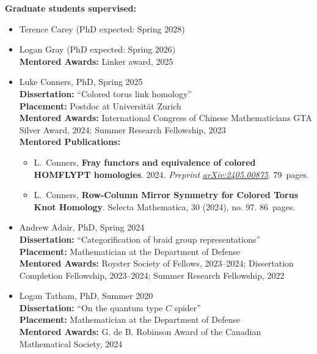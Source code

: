 \documentclass[10pt]{article}
\begin{document}
\smallskip
\noindent\textbf{Graduate students supervised:}
\begin{itemize}

\item Terence Carey (PhD expected: Spring 2028)

\item Logan Gray (PhD expected: Spring 2026) \\
\textbf{Mentored Awards:} 
Linker award, 2025


\item Luke Conners, PhD, Spring 2025 \\
\noindent \textbf{Dissertation:} ``Colored torus link homology'' \\
\noindent \textbf{Placement:} Postdoc at Universit\"{a}t Zurich \\
\textbf{Mentored Awards:}
International Congress of Chinese Mathematicians GTA Silver Award, 2024;
Summer Research Fellowship, 2023 \\
\textbf{Mentored Publications:}
\begin{itemize}
\item L.~Conners,
{\bf Fray functors and equivalence of colored HOMFLYPT homologies}.
2024.
\emph{Preprint}
\href{http://arxiv.org/abs/2405.00875}{\emph{arXiv:2405.00875}}.
79~pages.
\item L.~Conners,
{\bf Row-Column Mirror Symmetry for Colored Torus Knot Homology}.
Selecta Mathematica, 30 (2024), no. 97.
86~pages.
\end{itemize}

\item Andrew Adair, PhD, Spring 2024 \\
\noindent \textbf{Dissertation:} ``Categorification of braid group representations'' \\
\noindent \textbf{Placement:} Mathematician at the Department of Defense \\
\textbf{Mentored Awards:} 
Royster Society of Fellows, 2023--2024; 
Dissertation Completion Fellowship, 2023--2024; 
Summer Research Fellowship, 2022

\item Logan Tatham, PhD, Summer 2020 \\
\noindent \textbf{Dissertation:} ``On the quantum type $C$ spider'' \\
\noindent \textbf{Placement:} Mathematician at the Department of Defense \\
\textbf{Mentored Awards:} 
G. de B. Robinson Award of the Canadian Mathematical Society, 2024
\end{itemize}
\end{document}
